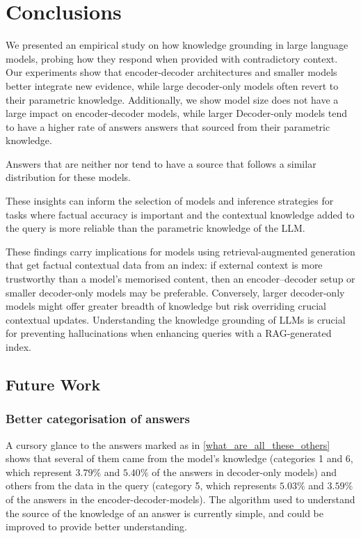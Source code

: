 \section{Conclusions}

We presented an empirical study on how knowledge grounding in large language models, probing how they respond when provided with contradictory context.
Our experiments show that encoder-decoder architectures and smaller models better integrate new evidence, while large decoder-only models often revert to their parametric knowledge.
Additionally, we show model size does not have a large impact on encoder-decoder models, while larger Decoder-only models tend to have a higher rate of answers answers that sourced from their parametric knowledge.

Answers that are neither \Parametric{} nor \Contextual{} tend to have a source that follows a similar distribution for these models.

These insights can inform the selection of models and inference strategies for tasks where factual accuracy is important and the contextual knowledge added to the query is more reliable than the parametric knowledge of the LLM.

These findings carry implications for models using retrieval-augmented generation that get factual contextual data from an index: if external context is more trustworthy than a model's memorised content, then an encoder–decoder setup or smaller decoder-only models may be preferable.
Conversely, larger decoder-only models might offer greater breadth of knowledge but risk overriding crucial contextual updates.
Understanding the knowledge grounding of LLMs is crucial for preventing hallucinations when enhancing queries with a RAG-generated index.

\subsection{Future Work}

\subsubsection{Better categorisation of \Other{} answers}
A cursory glance to the answers marked as \Other{} in \cref{what_are_all_these_others} shows that several of them came from the model's \Parametric{} knowledge (categories 1 and 6, which represent $3.79\%$ and $5.40\%$ of the answers in decoder-only models) and others from the \Contextual{} data in the query (category 5, which represents $5.03\%$ and $3.59\%$ of the answers in the encoder-decoder-models).
The algorithm used to understand the source of the knowledge of an answer is currently simple, and could be improved to provide better understanding.

